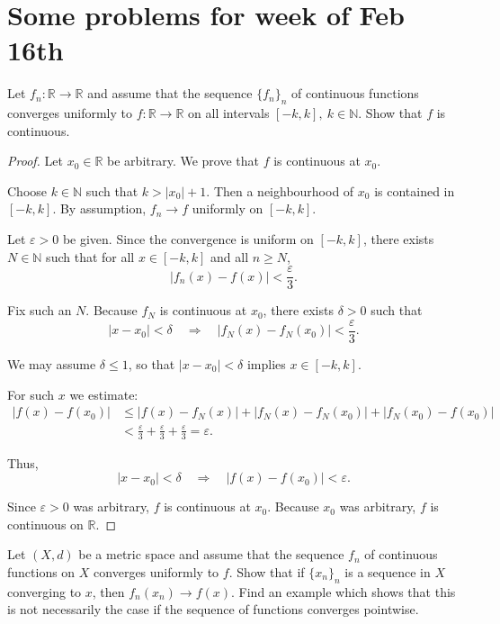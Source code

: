 \section{Some problems for week of Feb 16th}
\begin{prob}
    Let $f_n : \mathbb R \to \mathbb R$ and assume that the 
    sequence $\{f_n\}_n$ of continuous functions converges 
    uniformly to $f : \mathbb R \to \mathbb R$ on 
    all intervals $[-k,k], \ k \in \mathbb N$. 
    Show that $f$ is continuous. 
\end{prob}
\begin{proof}
    Let $x_0 \in \mathbb{R}$ be arbitrary. We prove that $f$ is 
    continuous at $x_0$.

    Choose $k \in \mathbb{N}$ such that $k > |x_0| + 1$. 
    Then a neighbourhood of $x_0$ is contained in $[-k,k]$. 
    By assumption, $f_n \to f$ uniformly on $[-k,k]$.

    Let $\varepsilon > 0$ be given. 
    Since the convergence is uniform on $[-k,k]$, there exists 
    $N \in \mathbb{N}$ such that for all $x \in [-k,k]$ and all 
    $n \ge N$,
    \[
        |f_n(x) - f(x)| < \frac{\varepsilon}{3}.
    \]

    Fix such an $N$. 
    Because $f_N$ is continuous at $x_0$, there exists 
    $\delta > 0$ such that
    \[
        |x - x_0| < \delta 
        \quad \Rightarrow \quad 
        |f_N(x) - f_N(x_0)| < \frac{\varepsilon}{3}.
    \]

    We may assume $\delta \le 1$, so that 
    $|x - x_0| < \delta$ implies $x \in [-k,k]$.

    For such $x$ we estimate:
    \[
        \begin{aligned}
            |f(x) - f(x_0)|
&\le |f(x) - f_N(x)| 
+ |f_N(x) - f_N(x_0)| 
+ |f_N(x_0) - f(x_0)| \\
&< \frac{\varepsilon}{3} 
+ \frac{\varepsilon}{3} 
+ \frac{\varepsilon}{3} 
= \varepsilon.
        \end{aligned}
    \]

    Thus,
    \[
        |x - x_0| < \delta 
        \quad \Rightarrow \quad 
        |f(x) - f(x_0)| < \varepsilon.
    \]

    Since $\varepsilon > 0$ was arbitrary, $f$ is continuous at $x_0$. 
    Because $x_0$ was arbitrary, $f$ is continuous on $\mathbb{R}$.
\end{proof}
\begin{prob}
    Let $(X,d)$ be a metric space and assume that the sequence 
    $f_n$ of continuous functions on $X$ converges uniformly 
    to $f$. Show that if $\{x_n\}_n$ is a sequence in $X$ converging 
    to $x$, then $f_n(x_n) \to f(x)$. Find an example which 
    shows that this is not necessarily the case if the 
    sequence of functions converges pointwise. 
\end{prob}
